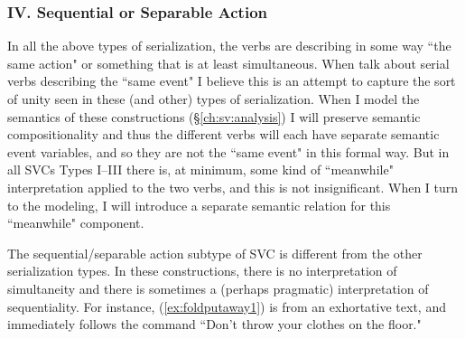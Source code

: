 \begin{comment}
\ex~ \label{ex:talkabout}
\begingl
\glpreamble ʔuḥʔaƛiič n̓uw̓iiqskqs \textbf{ʔuumac̓kʷ} \textbf{ʔiiqḥuk} ʔumʔiiqskqs. //
\gla ʔuḥ=ʔaƛ=(y)ii=č n̓uw̓iiqsu=ʔak=qaˑs \textbf{ʔu-L.mac̓uk} \textbf{ʔiiqḥ-uk} ʔumʔiiqsu=ʔak=qaˑs //
\glb be=\textsc{now}=\textsc{weak.3}=\textsc{hrsy} father=\textsc{poss}=\textsc{defn.1sg} \textbf{talk.about} \textbf{tell-\textsc{dr}} mother=\textsc{poss}=\textsc{defn.1sg} //
\glft `It was my father who told my mother about it.' (\textbf{Q}, Sophie Billy) //
\endgl
\xe

Like the other SVCs, the transitive verb can be separated from its object.


\end{comment}

\subsubsection{IV. Sequential or Separable Action} \label{ch:sv:data:type4}

\vspace{10pt}

In all the above types of serialization, the verbs are describing in some way ``the same action" or something that is at least simultaneous. When \cite{aikhenvalddixon2006} talk about serial verbs describing the ``same event" I believe this is an attempt to capture the sort of unity seen in these (and other) types of serialization. When I model the semantics of these constructions (\S\ref{ch:sv:analysis}) I will preserve semantic compositionality and thus the different verbs will each have separate semantic event variables, and so they are not the ``same event" in this formal way. But in all SVCs Types I--III there is, at minimum, some kind of ``meanwhile" interpretation applied to the two verbs, and this is not insignificant. When I turn to the modeling, I will introduce a separate semantic relation for this ``meanwhile" component.

The sequential/separable action subtype of SVC is different from the other serialization types. In these constructions, there is no interpretation of simultaneity and there is sometimes a (perhaps pragmatic) interpretation of sequentiality. For instance, (\ref{ex:foldputaway1}) is from an exhortative text, and immediately follows the command ``Don't throw your clothes on the floor."

